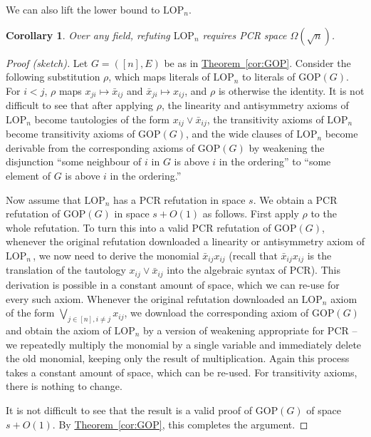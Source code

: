 \documentclass[11pt]{article}
\numberwithin{equation}{section}
\newtheorem{corollary}[theorem]{Corollary}
\theoremstyle{definition}
\theoremstyle{plain}
\newcommand{\expref}[2]{\hyperref[#2]{#1~\ref{#2}}}
\newcommand\LOP{\mathrm{LOP}}
\newcommand\GOP{\mathrm{GOP}}
\begin{document}
We can also lift the lower bound to $\LOP_n$.
\begin{corollary} 
Over any field, refuting $\LOP_n$ requires PCR space $\Omega(\sqrt{n})$. 
\end{corollary}
%
\begin{proof}[Proof (sketch)] %
Let  $G=([n],E)$ be as in \expref{Theorem}{cor:GOP}.
Consider the following substitution $\rho$,
which maps literals of $\LOP_n$ to literals of $\GOP(G)$.
For $i<j$,
$\rho$ maps $x_{ji} \mapsto \bar x_{ij}$
and $\bar x_{ji} \mapsto x_{ij}$, 
and $\rho$ is otherwise the identity.
It is not difficult to see that after applying $\rho$, the linearity and antisymmetry axioms of $\LOP_n$ become
tautologies of the form $x_{ij} \vee \bar x_{ij}$,
the transitivity axioms of $\LOP_n$ become transitivity axioms of $\GOP(G)$,
and the  wide clauses of $\LOP_n$ become 
derivable from the corresponding axioms of $\GOP(G)$
by weakening the disjunction 
``some neighbour of $i$ in $G$ is above $i$ in the ordering''
to ``some element of $G$ is above $i$ in the ordering.''

Now assume that $\LOP_n$ has a PCR refutation in space $s$. 
We obtain a PCR refutation of $\GOP(G)$ 
in space $s+O(1)$ as follows.
First apply $\rho$ to the whole refutation. To turn this into a valid PCR refutation of $\GOP(G)$, 
whenever the original refutation downloaded a linearity or antisymmetry axiom of $\LOP_n$\,, 
we now need to derive the monomial $\bar x_{ij}  x_{ij}$ 
(recall that $\bar x_{ij} x_{ij}$ is the translation of the
tautology $x_{ij} \vee \bar x_{ij}$ into the algebraic syntax of PCR).
This derivation is possible in a constant amount of space, which we
can re-use for every such axiom.
Whenever the original refutation downloaded an $\LOP_n$ axiom of the form $\bigvee_{j\in [n], i\not =j} x_{ij}$,
we download the corresponding axiom of $\GOP(G)$ and obtain the axiom of $\LOP_n$ by a version of weakening appropriate for PCR -- 
we repeatedly multiply the monomial by a single variable and immediately delete the old monomial, keeping only the result of multiplication.
Again this process takes a constant amount of space, which can be re-used.
For transitivity axioms, there is nothing to change. 

It is not difficult to see that the result is a valid proof of $\GOP(G)$ of space~$s+O(1)$.
By \expref{Theorem}{cor:GOP}, this completes the argument.
\end{proof}
\end{document}
